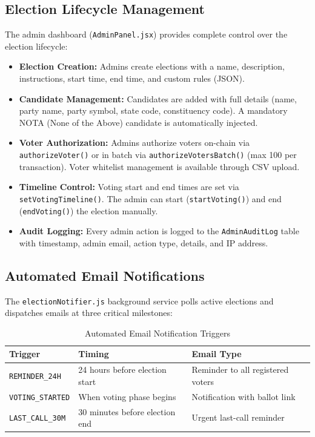 \documentclass[oneside,a4paper,12pt]{book}
\begin{document}
\subsection{Election Lifecycle Management}
The admin dashboard (\texttt{AdminPanel.jsx}) provides complete control over the election lifecycle:
\begin{itemize}[leftmargin=1.5cm]
    \item \textbf{Election Creation:} Admins create elections with a name, description, instructions, start time, end time, and custom rules (JSON).
    \item \textbf{Candidate Management:} Candidates are added with full details (name, party name, party symbol, state code, constituency code). A mandatory NOTA (None of the Above) candidate is automatically injected.
    \item \textbf{Voter Authorization:} Admins authorize voters on-chain via \texttt{authorizeVoter()} or in batch via \texttt{authorizeVotersBatch()} (max 100 per transaction). Voter whitelist management is available through CSV upload.
    \item \textbf{Timeline Control:} Voting start and end times are set via \texttt{setVotingTimeline()}. The admin can start (\texttt{startVoting()}) and end (\texttt{endVoting()}) the election manually.
    \item \textbf{Audit Logging:} Every admin action is logged to the \texttt{AdminAuditLog} table with timestamp, admin email, action type, details, and IP address.
\end{itemize}

\subsection{Automated Email Notifications}
The \texttt{electionNotifier.js} background service polls active elections and dispatches emails at three critical milestones:

\begin{table}[htbp]
\centering
\renewcommand{\arraystretch}{1.3}
\small
\begin{tabularx}{\textwidth}{|p{3.5cm}|p{4.5cm}|X|}
\hline
\textbf{Trigger} & \textbf{Timing} & \textbf{Email Type} \\
\hline
\texttt{REMINDER\_24H} & 24 hours before election start & Reminder to all registered voters \\
\hline
\texttt{VOTING\_STARTED} & When voting phase begins & Notification with ballot link \\
\hline
\texttt{LAST\_CALL\_30M} & 30 minutes before election end & Urgent last-call reminder \\
\hline
\end{tabularx}
\caption{Automated Email Notification Triggers}
\label{tab:notifications}
\end{table}
\end{document}
